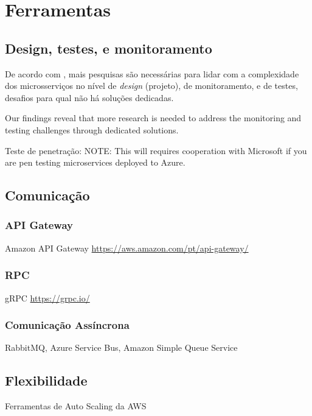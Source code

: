 \chapter{Ferramentas}\label{chapter-ferramentas}


\section{Design, testes, e monitoramento}

De acordo com , mais pesquisas são necessárias para lidar com a complexidade dos microsserviços no nível de \emph{design} (projeto), de monitoramento, e de testes, desafios para qual não há soluções dedicadas.

Our findings reveal that more research is needed to address the monitoring and testing challenges through dedicated solutions. \cite{design-monitoring-testing-waseem}

Teste de penetração: NOTE: This will requires cooperation with Microsoft if you are pen testing microservices deployed to Azure.

\section{Comunicação}

\subsection*{API Gateway}
Amazon API Gateway \url{https://aws.amazon.com/pt/api-gateway/} 

\subsection*{RPC}
gRPC \url{https://grpc.io/}

\subsection*{Comunicação Assíncrona}
RabbitMQ, Azure Service Bus, Amazon Simple Queue Service

\section{Flexibilidade}
Ferramentas de Auto Scaling da AWS

